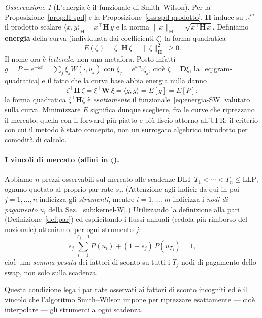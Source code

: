 \documentclass[11pt,a4paper]{article}
\theoremstyle{plain}
\theoremstyle{definition}
\theoremstyle{remark}
\newtheorem*{osservazione}{Osservazione}
\newcommand{\UFR}{\ensuremath{\mathrm{UFR}}}
\newcommand{\LLP}{\ensuremath{\mathrm{LLP}}}
\newcommand{\Hmat}{\mathbf{H}}
\newcommand{\transp}{^{\!\top}}
\begin{document}
\begin{osservazione}[L'energia \`e il funzionale di Smith--Wilson]
\label{oss:energia}
Per la Proposizione~\ref{prop:H-spd} e la Proposizione~\ref{oss:spd-prodotto}, $\Hmat$
induce su $\mathbb{R}^m$ il prodotto scalare
$\langle x,y\rangle_{\Hmat} = x\transp\Hmat\,y$ e la norma
$\|x\|_{\Hmat} = \sqrt{x\transp\Hmat\,x}$.
Definiamo \textbf{energia} della curva (individuata dai coefficienti $\zeta$) la forma
quadratica
\[
  E(\zeta) = \zeta\transp \Hmat\, \zeta = \|\zeta\|_{\Hmat}^2 \ \ge 0 .
\]
Il nome ora \`e \emph{letterale}, non una metafora. Posto infatti
$g = P - e^{-\omega t} = \sum_j \xi_j W(\cdot,u_j)$ con $\xi_j = e^{\omega u_j}\zeta_j$, cio\`e
$\zeta = \mathbf{D}\xi$, la~\eqref{eq:gram-quadratica} e il fatto che la curva base abbia
energia nulla danno
\[
  \zeta\transp\Hmat\,\zeta
  = \xi\transp\mathbf{W}\,\xi
  = \langle g,g\rangle = E[g] = E[P] :
\]
la forma quadratica $\zeta\transp\Hmat\zeta$ \`e \emph{esattamente} il
funzionale~\eqref{eq:energia-SW} valutato sulla curva. Minimizzare $E$ significa dunque
scegliere, fra le curve che riprezzano il mercato, quella con il forward pi\`u piatto e pi\`u
liscio attorno all'$\UFR$: il criterio con cui il metodo \`e stato concepito, non un
surrogato algebrico introdotto per comodit\`a di calcolo.
\end{osservazione}

\paragraph{I vincoli di mercato (affini in $\zeta$).}
Abbiamo $n$ prezzi osservabili sul mercato alle scadenze DLT $T_1<\cdots<T_n\le\LLP$, ognuno
quotato al proprio par rate $s_j$. (Attenzione agli indici: da qui in poi $j=1,\dots,n$
indicizza gli \emph{strumenti}, mentre $i=1,\dots,m$ indicizza i \emph{nodi di pagamento}
$u_i$ della Sez.~\ref{sub:kernel-W}.) Utilizzando la definizione alla pari
(Definizione~\ref{def:par}) ed esplicitando i flussi annuali (cedola pi\`u rimborso del
nozionale) otteniamo, per ogni strumento $j$:
\[
  s_j\,\sum_{i=1}^{T_j-1} P(u_i) + (1+s_j)\,P(u_{T_j}) = 1,
\]
cio\`e una \emph{somma pesata} dei fattori di sconto su tutti i $T_j$ nodi di pagamento dello
swap, non solo sulla scadenza.

Questa condizione lega i par rate osservati ai fattori di sconto incogniti ed \`e il vincolo che
l'algoritmo Smith--Wilson impone per riprezzare esattamente --- cio\`e interpolare --- gli
strumenti a ogni scadenza.
\end{document}
